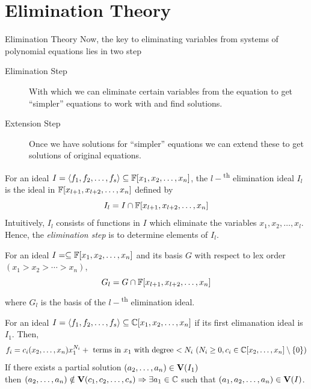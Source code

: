 \documentclass[aspectratio=169, handout, 10pt, hyperref=colorlinks]{beamer}
\begin{document}
\section{Elimination Theory}{\label{sec:eliminationtheory}}
\begin{frame}[allowframebreaks]{Elimination Theory}
    Now, the key to eliminating variables from systems of polynomial equations lies in two step
\begin{description}
    \item[Elimination Step] With which we can eliminate certain variables from the equation to get ``simpler'' equations to work with and find solutions.
    \item[Extension Step] Once we have solutions for ``simpler'' equations we can extend these to get solutions of original equations.
\end{description}
\begin{defn}
    For an ideal $I=\langle f_1,f_2,\ldots,f_s\rangle\subseteq\mathbb{F}[x_1, x_2, \ldots, x_n]$, the $l-$\textsuperscript{th} elimination ideal $I_l$ is the ideal in $\mathbb{F}[x_{l+1}, x_{l+2}, \ldots, x_n]$ defined by
    \begin{equation}
        I_l = I \cap \mathbb{F}[x_{l+1}, x_{l+2}, \ldots, x_n]
    \end{equation} 
    Intuitively,   $I_l$  consists of functions in $I$ which eliminate the variables $x_1, x_2, \ldots, x_l$. Hence, the \emph{elimination step} is to determine elements of $I_l$.
\end{defn}
\begin{theorem}
    For an ideal $I=\subseteq\mathbb{F}[x_1, x_2, \ldots, x_n]$ and its \Grob basis $G$ with respect to lex order $(x_1>x_2>\cdots>x_n)$,
    \begin{equation}
        G_l = G \cap \mathbb{F}[x_{l+1}, x_{l+2}, \ldots, x_n]
    \end{equation}
    where $G_l$ is the \Grob basis of the $l-$\textsuperscript{th} elimination ideal.
\end{theorem}
\begin{theorem}
    For an ideal $I=\langle f_1,f_2,\ldots,f_s\rangle\subseteq\mathbb{C}[x_1, x_2, \ldots, x_n]$ if its first elimanation ideal is $I_1$. Then,
    \begin{equation}
        f_i = c_i(x_2,\ldots,x_n)x_1^{N_i} + \text{ terms in $x_1$ with degree $< N_i$}\ (N_i\geq0, c_i\in\mathbb{C}[x_2, \ldots, x_n]\setminus\{0\})
    \end{equation}
    If there exists a partial solution $(a_2, \ldots, a_n)\in \textbf{V}(I_1)$ \\
    then $(a_2, \ldots, a_n)\notin \textbf{V}(c_1, c_2, \ldots, c_s)\Rightarrow \exists a_1\in \mathbb{C}$ such that $(a_1, a_2, \ldots, a_n)\in \textbf{V}(I)$.
\end{theorem} 
\end{frame}
\end{document}
